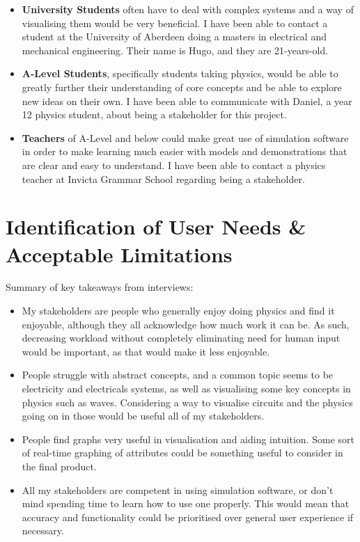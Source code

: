     \begin{itemize}
        \item \textbf{University Students} often have to deal with complex systems and a way of visualising them would be very beneficial. I have been able to contact a student at the University of Aberdeen doing a masters in electrical and mechanical engineering. Their name is Hugo, and they are 21-years-old.
        \item \textbf{A-Level Students}, specifically students taking physics,  would be able to greatly further their understanding of core concepts and be able to explore new ideas on their own. I have been able to communicate with Daniel, a year 12 physics student, about being a stakeholder for this project.
        \item \textbf{Teachers} of A-Level and below could make great use of simulation software in order to make learning much easier with models and demonstrations that are clear and easy to understand. I have been able to contact a physics teacher at Invicta Grammar School regarding being a stakeholder.
    \end{itemize}

\section{Identification of User Needs \& Acceptable Limitations}

    Summary of key takeaways from interviews:
    \begin{itemize}
        \item My stakeholders are people who generally enjoy doing physics and find it enjoyable, although they all acknowledge how much work it can be. As such, decreasing workload without completely eliminating need for human input would be important, as that would make it less enjoyable.
        \item People struggle with abstract concepts, and a common topic seems to be electricity and electricals systems, as well as visualising some key concepts in physics such as waves. Considering a way to visualise circuits and the physics going on in those would be useful all of my stakeholders.
        \item People find graphs very useful in visualisation and aiding intuition. Some sort of real-time graphing of attributes could be something useful to consider in the final product.
        \item All my stakeholders are competent in using simulation software, or don't mind spending time to learn how to use one properly. This would mean that accuracy and functionality could be prioritised over general user experience if necessary. 
    \end{itemize}

